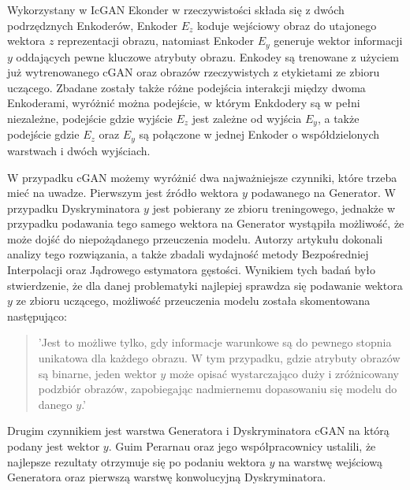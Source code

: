     Wykorzystany w IcGAN Ekonder w rzeczywistości składa się z dwóch podrzędznych
    Enkoderów, Enkoder $E_{z}$ koduje wejściowy obraz do utajonego wektora $z$ reprezentacji
    obrazu, natomiast Enkoder $E_{y}$ generuje wektor informacji $y$ oddających
    pewne kluczowe atrybuty obrazu. Enkodey są trenowane z użyciem już wytrenowanego
    cGAN oraz obrazów rzeczywistych z etykietami ze zbioru uczącego. Zbadane
    zostały także różne podejścia interakcji między dwoma Enkoderami, wyróżnić
    można podejście, w którym Enkdodery są w pełni niezależne, podejście
    gdzie wyjście $E_{z}$ jest zależne od wyjścia $E_{y}$, a także podejście
    gdzie $E_{z}$ oraz $E_{y}$ są połączone w jednej Enkoder o współdzielonych
    warstwach i dwóch wyjściach.

    W przypadku cGAN możemy wyróżnić dwa najważniejsze czynniki, które trzeba
    mieć na uwadze. Pierwszym jest źródło wektora $y$ podawanego na
    Generator. W przypadku Dyskryminatora $y$ jest pobierany ze
    zbioru treningowego, jednakże w przypadku podawania tego
    samego wektora na Generator wystąpiła możliwość, że może dojść do niepożądanego
    przeuczenia modelu. Autorzy artykułu dokonali analizy tego rozwiązania,
    a także zbadali wydajność metody Bezpośredniej Interpolacji oraz
    Jądrowego estymatora gęstości. Wynikiem tych badań było stwierdzenie, że
    dla danej problematyki najlepiej sprawdza się podawanie wektora $y$ ze zbioru
    uczącego, możliwość przeuczenia modelu została skomentowana następująco:
    \begin{quote}
      'Jest to możliwe tylko, gdy informacje warunkowe są do pewnego stopnia
      unikatowa dla każdego obrazu. W tym przypadku, gdzie atrybuty obrazów są
      binarne, jeden wektor $y$ może opisać wystarczająco duży i zróżnicowany
      podzbiór obrazów, zapobiegając nadmiernemu dopasowaniu się modelu do
      danego $y$.'
    \end{quote}
    Drugim czynnikiem jest warstwa Generatora i Dyskryminatora cGAN na
    którą podany jest wektor $y$. Guim Perarnau oraz jego współpracownicy ustalili, że najlepsze rezultaty otrzymuje się po podaniu wektora $y$ na warstwę wejściową
    Generatora oraz pierwszą warstwę konwolucyjną Dyskryminatora.

